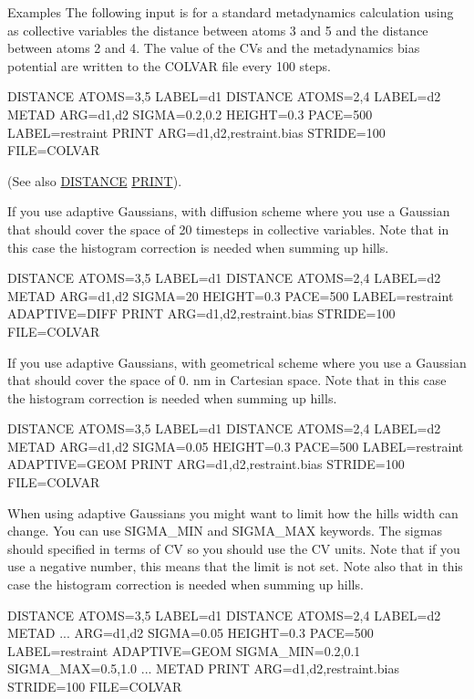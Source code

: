 \begin{DoxyParagraph}{Examples}
The following input is for a standard metadynamics calculation using as collective variables the distance between atoms 3 and 5 and the distance between atoms 2 and 4. The value of the C\+Vs and the metadynamics bias potential are written to the C\+O\+L\+V\+A\+R file every 100 steps. \begin{DoxyVerb}DISTANCE ATOMS=3,5 LABEL=d1
DISTANCE ATOMS=2,4 LABEL=d2
METAD ARG=d1,d2 SIGMA=0.2,0.2 HEIGHT=0.3 PACE=500 LABEL=restraint
PRINT ARG=d1,d2,restraint.bias STRIDE=100  FILE=COLVAR
\end{DoxyVerb}
 (See also \hyperlink{DISTANCE}{D\+I\+S\+T\+A\+N\+C\+E} \hyperlink{PRINT}{P\+R\+I\+N\+T}).
\end{DoxyParagraph}
\begin{DoxyParagraph}{}
If you use adaptive Gaussians, with diffusion scheme where you use a Gaussian that should cover the space of 20 timesteps in collective variables. Note that in this case the histogram correction is needed when summing up hills. \begin{DoxyVerb}DISTANCE ATOMS=3,5 LABEL=d1
DISTANCE ATOMS=2,4 LABEL=d2
METAD ARG=d1,d2 SIGMA=20 HEIGHT=0.3 PACE=500 LABEL=restraint ADAPTIVE=DIFF
PRINT ARG=d1,d2,restraint.bias STRIDE=100  FILE=COLVAR
\end{DoxyVerb}

\end{DoxyParagraph}
\begin{DoxyParagraph}{}
If you use adaptive Gaussians, with geometrical scheme where you use a Gaussian that should cover the space of 0. nm in Cartesian space. Note that in this case the histogram correction is needed when summing up hills. \begin{DoxyVerb}DISTANCE ATOMS=3,5 LABEL=d1
DISTANCE ATOMS=2,4 LABEL=d2
METAD ARG=d1,d2 SIGMA=0.05 HEIGHT=0.3 PACE=500 LABEL=restraint ADAPTIVE=GEOM
PRINT ARG=d1,d2,restraint.bias STRIDE=100  FILE=COLVAR
\end{DoxyVerb}

\end{DoxyParagraph}
\begin{DoxyParagraph}{}
When using adaptive Gaussians you might want to limit how the hills width can change. You can use S\+I\+G\+M\+A\+\_\+\+M\+I\+N and S\+I\+G\+M\+A\+\_\+\+M\+A\+X keywords. The sigmas should specified in terms of C\+V so you should use the C\+V units. Note that if you use a negative number, this means that the limit is not set. Note also that in this case the histogram correction is needed when summing up hills. \begin{DoxyVerb}DISTANCE ATOMS=3,5 LABEL=d1
DISTANCE ATOMS=2,4 LABEL=d2
METAD ...
  ARG=d1,d2 SIGMA=0.05 HEIGHT=0.3 PACE=500 LABEL=restraint ADAPTIVE=GEOM
  SIGMA_MIN=0.2,0.1 SIGMA_MAX=0.5,1.0   
... METAD 
PRINT ARG=d1,d2,restraint.bias STRIDE=100  FILE=COLVAR
\end{DoxyVerb}

\end{DoxyParagraph}
